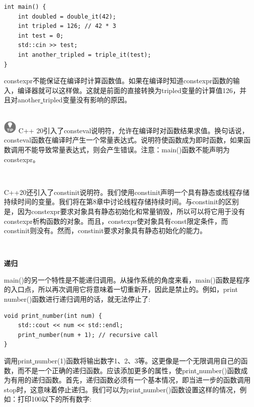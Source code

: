 \begin{lstlisting}[caption={}]
int main() {
	int doubled = double_it(42);
	int tripled = 126; // 42 * 3
	int test = 0;
	std::cin >> test;
	int another_tripled = triple_it(test);
}
\end{lstlisting}

constexpr不能保证在编译时计算函数值。如果在编译时知道constexpr函数的输入，编译器就可以这样做。这就是前面的直接转换为tripled变量的计算值126，并且对another\underline{ }tripled变量没有影响的原因。 \par

\hspace*{\fill} \\ %
\includegraphics[width=0.05\textwidth]{images/tip}
C++ 20引入了consteval说明符，允许在编译时对函数结果求值。换句话说，consteval函数在编译时产生一个常量表达式。说明符使函数成为即时函数，如果函数调用不能导致常量表达式，则会产生错误。注意：main()函数不能声明为constexpr。 \par
\noindent\textbf{}\ \par

C++20还引入了constinit说明符。我们使用constinit声明一个具有静态或线程存储持续时间的变量。我们将在第8章中讨论线程存储持续时间。与constinit的区别是，因为constexpr要求对象具有静态初始化和常量销毁，所以可以将它用于没有constexpr析构函数的对象。而且，constexpr使对象具有const限定条件，而constinit则没有。然而，constinit要求对象具有静态初始化的能力。 \par

\noindent\textbf{}\ \par
\textbf{递归} \ \par
main()的另一个特性是不能递归调用。从操作系统的角度来看，main()函数是程序的入口点，所以再次调用它将意味着一切重新开，因此是禁止的。例如，print\underline{ }number()函数进行递归调用的话，就无法停止了: \par

\begin{lstlisting}[caption={}]
void print_number(int num) {
	std::cout << num << std::endl;
	print_number(num + 1); // recursive call
}
\end{lstlisting}

调用print\underline{ }number(1)函数将输出数字1、2、3等。这更像是一个无限调用自己的函数，而不是一个正确的递归函数。应该添加更多的属性，使print\underline{ }number()函数成为有用的递归函数。首先，递归函数必须有一个基本情况，即当进一步的函数调用stop时，这意味着停止递归。我们可以为print\underline{ }number()函数设置这样的情况，例如：打印100以下的所有数字: \par

